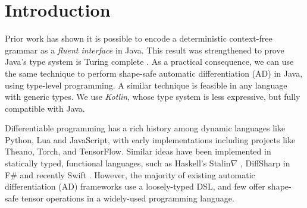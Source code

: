\documentclass{article}
\begin{document}


    \printAffiliationsAndNotice{}  %

    \section{Introduction}
    \label{submission}

    Prior work has shown it is possible to encode a deterministic context-free grammar as a \textit{fluent interface} \cite{gil2016formal} in Java. This result was strengthened to prove Java's type system is Turing complete  \cite{Grigore:2017:JGT:3009837.3009871}. As a practical consequence, we can use the same technique to perform shape-safe automatic differentiation (AD) in Java, using type-level programming. A similar technique is feasible in any language with generic types. We use \textit{Kotlin}, whose type system is less expressive, but fully compatible with Java.

    Differentiable programming has a rich history among dynamic languages like Python, Lua and JavaScript, with early implementations including projects like Theano, Torch, and TensorFlow. Similar ideas have been implemented in statically typed, functional languages, such as Haskell's Stalin$\nabla$ \cite{pearlmutter2008using}, DiffSharp in F\# \cite{DBLP:journals/corr/BaydinPS15} and recently Swift \cite{swift}. However, the majority of existing automatic differentiation (AD) frameworks use a loosely-typed DSL, and few offer shape-safe tensor operations in a widely-used programming language.
\end{document}
